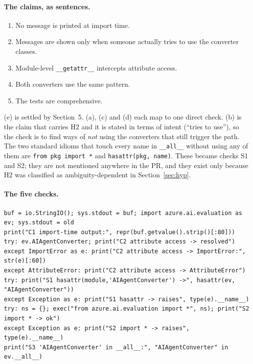 \documentclass[11pt,a4paper]{article}
\newcommand{\code}[1]{\texttt{#1}}
\begin{document}
\paragraph{The claims, as sentences.}
\begin{enumerate}[nosep,label=(\alph*)]
  \item No message is printed at import time.
  \item Messages are shown only when someone actually tries to use the converter classes.
  \item Module-level \code{\_\_getattr\_\_} intercepts attribute access.
  \item Both converters use the same pattern.
  \item The tests are comprehensive.
\end{enumerate}
(e) is settled by Section~5. (a), (c) and (d) each map to one direct check. (b) is the claim that carries H2 and it is stated in terms of intent (``tries to use''), so the check is to find ways of \emph{not} using the converters that still trigger the path. The two standard idioms that touch every name in \code{\_\_all\_\_} without using any of them are \code{from pkg import *} and \code{hasattr(pkg, name)}. These became checks S1 and S2; they are not mentioned anywhere in the PR, and they exist only because H2 was classified as ambiguity-dependent in Section~\ref{sec:hyp}.

\paragraph{The five checks.}
\begin{lstlisting}
buf = io.StringIO(); sys.stdout = buf; import azure.ai.evaluation as ev; sys.stdout = old
print("C1 import-time output:", repr(buf.getvalue().strip()[:80]))
try: ev.AIAgentConverter; print("C2 attribute access -> resolved")
except ImportError as e: print("C2 attribute access -> ImportError:", str(e)[:60])
except AttributeError: print("C2 attribute access -> AttributeError")
try: print("S1 hasattr(module,'AIAgentConverter') ->", hasattr(ev, "AIAgentConverter"))
except Exception as e: print("S1 hasattr -> raises", type(e).__name__)
try: ns = {}; exec("from azure.ai.evaluation import *", ns); print("S2 import * -> ok")
except Exception as e: print("S2 import * -> raises", type(e).__name__)
print("S3 'AIAgentConverter' in __all__:", "AIAgentConverter" in ev.__all__)
\end{lstlisting}
\end{document}
